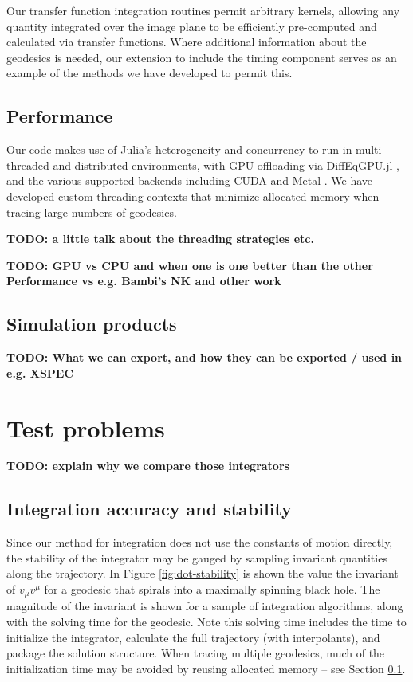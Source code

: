 \documentclass[fleqn,usenatbib]{mnras}
\newcommand{\todo}[1]{{\noindent \bf \color{red} TODO: #1}}
\begin{document}
Our transfer function integration routines permit arbitrary kernels, allowing any quantity integrated over the image plane to be efficiently pre-computed and calculated via transfer functions. Where additional information about the geodesics is needed, our extension to include the timing component serves as an example of the methods we have developed to permit this.

\subsection{Performance}
\label{sec:performance}

Our code makes use of Julia's heterogeneity and concurrency to run in multi-threaded and distributed environments, with GPU-offloading via DiffEqGPU.jl \citep{utkarsh2023automated}, and the various supported backends including CUDA and Metal \citep{besard2018juliagpu}. We have developed custom threading contexts that minimize allocated memory when tracing large numbers of geodesics.


\todo{a little talk about the threading strategies etc.}

\todo{GPU vs CPU and when one is one better than the other
Performance vs e.g. Bambi's NK and other work}

\subsection{Simulation products}

\todo{What we can export, and how they can be exported / used in e.g. XSPEC}

\section{Test problems}

\todo{explain why we compare those integrators}

\subsection{Integration accuracy and stability}

Since our method for integration does not use the constants of motion directly, the stability of the integrator may be gauged by sampling invariant quantities along the trajectory. In Figure \ref{fig:dot-stability} is shown the value the invariant of $v_\mu v^\mu$ for a geodesic that spirals into a maximally spinning black hole. The magnitude of the invariant is shown for a sample of integration algorithms, along with the solving time for the geodesic. Note this solving time includes the time to initialize the integrator, calculate the full trajectory (with interpolants), and package the solution structure. When tracing multiple geodesics, much of the initialization time may be avoided by reusing allocated memory -- see Section \ref{sec:performance}.
\end{document}
